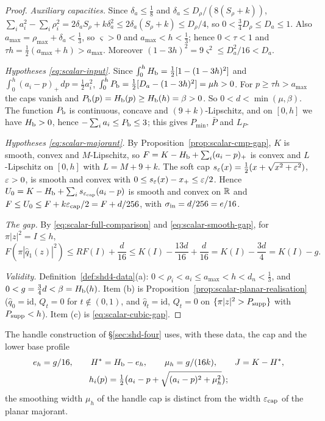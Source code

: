 \begin{proof}
\emph{Auxiliary capacities.} Since $\delta_a\le\frac18$ and $\delta_a\le D_\rho/(8(S_\rho+k))$,
$\sum_ia_i^2-\sum_i\rho_i^2=2\delta_aS_\rho+k\delta_a^2\le2\delta_a(S_\rho+k)\le D_\rho/4$, so
$0<\frac34D_\rho\le D_a\le1$. Also $a_{\max}=\rho_{\max}+\delta_a<\frac13$, so $\varsigma>0$ and
$a_{\max}<h<\frac13$; hence $0<\tau<1$ and $\tau h=\frac12(a_{\max}+h)>a_{\max}$. Moreover
$(1-3h)^2=9\varsigma^2\le D_a^2/16<D_a$.

\emph{Hypotheses \eqref{eq:scalar-input}.} Since $\int_0^hH_{\mathrm b}=\frac12[1-(1-3h)^2]$ and $\int_0^h(a_i-p)_+\,dp=\frac12a_i^2$,
$\int_0^hP_{\mathrm b}=\frac12[D_a-(1-3h)^2]=\mu h>0$. For $p\ge\tau h>a_{\max}$ the caps vanish and
$P_{\mathrm b}(p)=H_{\mathrm b}(p)\ge H_{\mathrm b}(h)=\beta>0$. So $0<d<\min(\mu,\beta)$. The function $P_{\mathrm b}$ is continuous, concave and
$(9+k)$-Lipschitz, and on $[0,h]$ we have $H_{\mathrm b}>0$, hence $-\sum_ia_i\le P_{\mathrm b}\le3$; this gives $P_{\min}$, $\bar P$ and
$L_P$.

\emph{Hypotheses \eqref{eq:scalar-majorant}.} By Proposition~\ref{prop:scalar-cmp-gap}, $K$ is smooth, convex and
$M$-Lipschitz, so $F=K-H_{\mathrm b}+\sum_i(a_i-p)_+$ is convex and $L$-Lipschitz on $[0,h]$ with $L=M+9+k$. The soft cap
$s_\varepsilon(x)=\frac12(x+\sqrt{x^2+\varepsilon^2})$, $\varepsilon>0$, is smooth and convex with $0\le s_\varepsilon(x)-x_+\le\varepsilon/2$. Hence
$U_0=K-H_{\mathrm b}+\sum_is_{\varepsilon_{\rm cap}}(a_i-p)$ is smooth and convex on $\mathbb{R}$ and $F\le U_0\le F+k\varepsilon_{\rm cap}/2=F+d/256$,
with $\sigma_{\rm in}=d/256=e/16$.

\emph{The gap.} By \eqref{eq:scalar-full-comparison} and \eqref{eq:scalar-smooth-gap}, for $\pi|z|^2=I\le h$,
\[
 F(\pi|\widehat q_1(z)|^2)\le RF(I)+\frac d{16}\le K(I)-\frac{13d}{16}+\frac d{16}=K(I)-\frac{3d}4=K(I)-g.
\]

\emph{Validity.} Definition~\ref{def:shd4-data}(a): $0<\rho_i<a_i\le a_{\max}<h<d_n<\frac13$, and $0<g=\frac34d<\beta=H_{\mathrm b}(h)$.
Item (b) is Proposition~\ref{prop:scalar-planar-realisation} ($\widehat q_0=\mathrm{id}$, $Q_t=0$ for $t\notin(0,1)$, and
$\widehat q_t=\mathrm{id}$, $Q_t=0$ on $\{\pi|z|^2>P_{\rm supp}\}$ with $P_{\rm supp}<h$). Item (c) is
\eqref{eq:scalar-cubic-gap}.
\end{proof}

The handle construction of \S\ref{sec:shd-four} uses, with these data, the cap and the lower base profile
\[
 \begin{gathered}
 e_h=g/16,\qquad H^*=H_{\mathrm b}-e_h,\qquad \mu_h=g/(16k),\qquad J=K-H^*,\\
 h_i(p)=\tfrac12\bigl(a_i-p+\sqrt{(a_i-p)^2+\mu_h^2}\bigr);
 \end{gathered}
\]
the smoothing width $\mu_h$ of the handle cap is distinct from the width $\varepsilon_{\rm cap}$ of the planar majorant.


